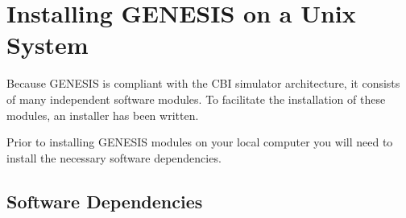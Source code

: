 \documentclass[12pt]{article}
\begin{document}


 




\section*{Installing GENESIS on a Unix System}

Because GENESIS is compliant with the CBI simulator architecture, it consists of many independent software modules. To facilitate the installation of these modules, an installer has been written.

Prior to installing GENESIS modules on your local computer you will need to install the necessary software dependencies.

\subsection*{Software Dependencies}
\end{document}
